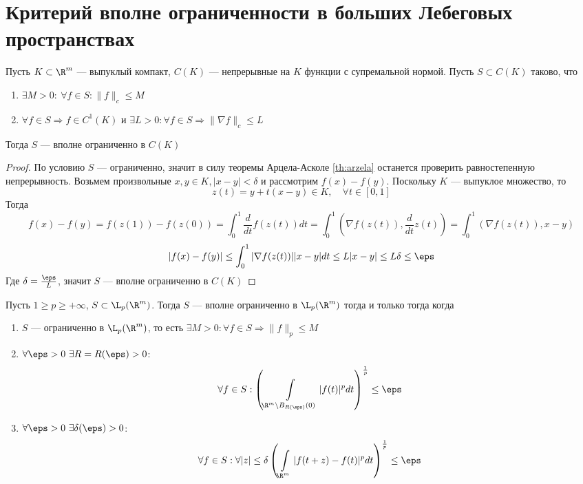 \newpage
\section{Критерий вполне ограниченности в больших Лебеговых пространствах}

\begin{claim}
	Пусть $K \subset \R^m$ --- выпуклый компакт, $C(K)$ --- непрерывные на $K$ функции с супремальной нормой. Пусть $S \subset C(K)$ таково, что 
	\begin{enumerate}
		\item $\exists M > 0: \ \forall f \in S :  \|f\|_c \leq M$
		\item $\forall f \in S \Rightarrow f \in C^1(K)$ и $\exists L > 0: \forall f \in S \Rightarrow \|\nabla f \|_c \leq L$
	\end{enumerate}
	Тогда $S$ --- вполне ограниченно в $C(K)$
\end{claim}
\begin{proof}
	По условию $S$ --- ограниченно, значит в силу теоремы Арцела-Асколе \ref{th:arzela} останется проверить равностепенную непрерывность. Возьмем произвольные $x,y \in K, |x-y| < \delta$ и рассмотрим $f(x) - f(y)$. Поскольку $K$ --- выпуклое множество, то 
	$$
	z(t) = y + t(x-y) \in K, \quad \forall t \in [0,1]
	$$
	Тогда 
	$$
	f(x) - f(y) = f(z(1)) - f(z(0)) = \int_{0}^{1} \frac{d}{dt}f(z(t))dt = \int_{0}^{1}\left(\nabla f(z(t)), \frac{d}{dt}z(t)\right) = \int_{0}^1(\nabla f(z(t)), x - y)
	$$
	$$
	|f(x)-f(y)| \leq \int_{0}^1|\nabla f(z(t))| |x-y| dt \leq L|x-y| \leq L\delta \leq \eps
	$$
	Где $\delta = \frac{\eps}{L}$, значит $S$ --- вполне ограниченно в $C(K)$
\end{proof}
\begin{theorem}
	Пусть $1 \geq p \geq +\infty$, $S \subset \L_p(\R^m)$. Тогда $S$ --- вполне ограниченно в $\L_p(\R^m)$ тогда и только тогда когда
	\begin{enumerate}
		\item $S$ --- ограниченно в $\L_p(\R^m)$, то есть $\exists M > 0: \forall f \in S \Rightarrow \|f\|_p \leq M$
		\item $\forall \eps > 0 \ \exists R = R(\eps) > 0$: 
		$$
		\forall f \in S: \left(\int\limits_{\R^m \setminus B_{R(\eps)}(0)} |f(t)|^pdt\right)^\frac{1}{p} \leq \eps
		$$
		\item $\forall \eps > 0 \ \exists \delta(\eps) > 0$:
		$$
		\forall f \in S : \forall |z| \leq \delta \left(\int\limits_{\R^m} |f(t + z) - f(t)|^p dt\right)^\frac{1}{p}  \leq \eps
		$$
	\end{enumerate}
\end{theorem}
